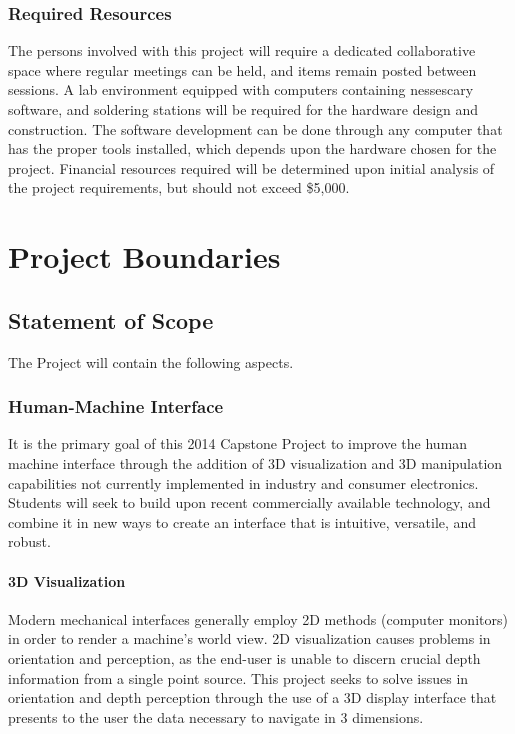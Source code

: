 \documentclass[11pt]{report}
\let\stdsection\section
\renewcommand\section{\newpage\stdsection}
\begin{document}
\subsubsection{Required Resources}
\par The persons involved with this project will require a dedicated collaborative space where regular meetings can be held, and items remain posted between sessions. A lab environment equipped with computers containing nessescary software, and soldering stations will be required for the hardware design and construction. The software development can be done through any computer that has the proper tools installed, which depends upon the hardware chosen for the project. Financial resources required will be determined upon initial analysis of the project requirements, but should not exceed \$5,000.

\section{Project Boundaries}

\subsection{Statement of Scope}
The Project will contain the following aspects.

\subsubsection{Human-Machine Interface}
\par It is the primary goal of this 2014 Capstone Project to improve the human machine interface through the addition of 3D visualization and 3D manipulation capabilities not currently implemented in industry and consumer electronics. Students will seek to build upon recent commercially available technology, and combine it in new ways to create an interface that is intuitive, versatile, and robust.

\paragraph{3D Visualization}
Modern mechanical interfaces generally employ 2D methods (computer monitors) in order to render a machine's world view. 2D visualization causes problems in orientation and perception, as the end-user is unable to discern crucial depth information from a single point source. This project seeks to solve issues in orientation and depth perception through the use of a 3D display interface that presents to the user the data necessary to navigate in 3 dimensions.
\end{document}
